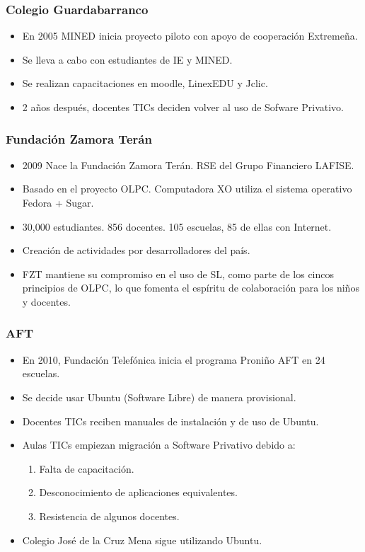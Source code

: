 \documentclass{beamer}
\begin{document}
\begin{frame}
\frametitle{Colegio Guardabarranco}
	\begin{itemize}
		\pause \item En 2005 MINED inicia proyecto piloto con apoyo de cooperaci\'on Extreme\~na.
		\pause \item Se lleva a cabo con estudiantes de IE y MINED.
		\pause \item Se realizan capacitaciones en moodle, LinexEDU y Jclic.
		\pause \item 2 a\~nos despu\'es, docentes TICs deciden volver al uso de Sofware Privativo.
	\end{itemize}
\end{frame}

\begin{frame}
\frametitle{Fundaci\'on Zamora Ter\'an}
	\begin{itemize}
		\pause \item 2009 Nace la Fundaci\'on Zamora Ter\'an. RSE del Grupo Financiero LAFISE.
		\pause \item Basado en el proyecto OLPC. Computadora XO utiliza el sistema operativo Fedora + Sugar.
		\pause \item 30,000 estudiantes. 856 docentes. 105 escuelas, 85 de ellas con Internet.
		\pause \item Creaci\'on de actividades por desarrolladores del pa\'is.
		\pause \item FZT mantiene su compromiso en el uso de SL, como parte de los cincos principios de OLPC, lo que fomenta el esp\'iritu de colaboraci\'on para los ni\~nos y docentes.
	\end{itemize}
\end{frame}

\begin{frame}
\frametitle{AFT}
	\begin{itemize}
		\pause \item En 2010, Fundaci\'on Telef\'onica inicia el programa Proni\~no AFT en 24 escuelas.
		\pause \item Se decide usar Ubuntu (\alert{Software Libre}) de manera provisional.
		\pause \item Docentes TICs reciben manuales de instalaci\'on y de uso de Ubuntu.
		\pause \item Aulas TICs empiezan migraci\'on a Software Privativo debido a:
			\begin{enumerate}
			\pause \item Falta de capacitaci\'on.
			\pause \item Desconocimiento de aplicaciones equivalentes.
			\pause \item Resistencia de algunos docentes.
			\end{enumerate}
		\pause \item Colegio Jos\'e de la Cruz Mena sigue utilizando Ubuntu.
	\end{itemize}
\end{frame}
\end{document}
